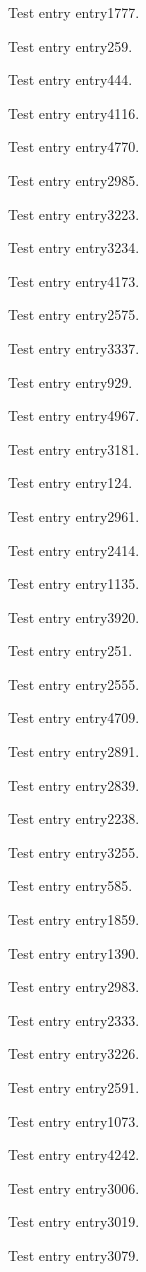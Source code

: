 Test entry \gls{entry1777}.

Test entry \gls{entry259}.

Test entry \gls{entry444}.

Test entry \gls{entry4116}.

Test entry \gls{entry4770}.

Test entry \gls{entry2985}.

Test entry \gls{entry3223}.

Test entry \gls{entry3234}.

Test entry \gls{entry4173}.

Test entry \gls{entry2575}.

Test entry \gls{entry3337}.

Test entry \gls{entry929}.

Test entry \gls{entry4967}.

Test entry \gls{entry3181}.

Test entry \gls{entry124}.

Test entry \gls{entry2961}.

Test entry \gls{entry2414}.

Test entry \gls{entry1135}.

Test entry \gls{entry3920}.

Test entry \gls{entry251}.

Test entry \gls{entry2555}.

Test entry \gls{entry4709}.

Test entry \gls{entry2891}.

Test entry \gls{entry2839}.

Test entry \gls{entry2238}.

Test entry \gls{entry3255}.

Test entry \gls{entry585}.

Test entry \gls{entry1859}.

Test entry \gls{entry1390}.

Test entry \gls{entry2983}.

Test entry \gls{entry2333}.

Test entry \gls{entry3226}.

Test entry \gls{entry2591}.

Test entry \gls{entry1073}.

Test entry \gls{entry4242}.

Test entry \gls{entry3006}.

Test entry \gls{entry3019}.

Test entry \gls{entry3079}.

